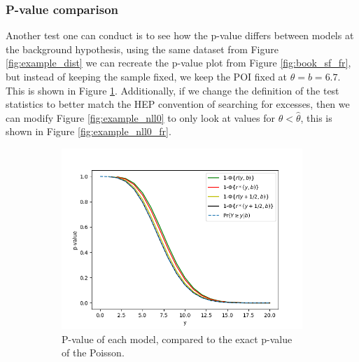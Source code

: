 \documentclass[14pt, a4paper]{article}  %
\begin{document}
\subsubsection{P-value comparison}
Another test one can conduct is to see how the p-value differs between models at the background hypothesis, using the same dataset from Figure \ref{fig:example_dist} we can recreate the p-value plot from Figure \ref{fig:book_sf_fr}, but instead of keeping the sample fixed, we keep the POI fixed at $\theta=b=6.7$. This is shown in Figure \ref{fig:example_pval}. Additionally, if we change the definition of the test statistics to better match the HEP convention of searching for excesses, then we can modify Figure \ref{fig:example_nll0} to only look at values for $\theta<\hat{\theta}$, this is shown in Figure \ref{fig:example_nll0_fr}.
\begin{figure}[!ht]
	\centering
	\begin{subfigure}[b]{0.49\textwidth}
        \centering\includegraphics[width=1\textwidth]{Poisson_approximation_b6p7/p_values.png}\caption{P-value of each model, compared to the exact p-value of the Poisson. }\label{fig:example_pval}
     \end{subfigure}
     \hfill
     \begin{subfigure}[b]{0.49\textwidth}
        \centering

\end{subfigure}
\end{figure}
\end{document}
